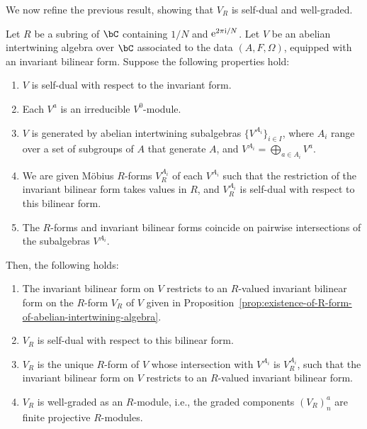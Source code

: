 We now refine the previous result, showing that $V_R$ is self-dual and well-graded.

\begin{prop} \label{prop:extension-of-self-dual-form}Let $R$ be a subring of $\bC$ containing $1/N$ and ${\rm e}^{2\pi {\rm i}/N}$. Let $V$ be an abelian intertwining algebra over $\bC$ associated to the data $(A,F,\Omega)$, equipped with an invariant bilinear form. Suppose the following properties hold:
\begin{enumerate}\itemsep=0pt
\item[$1.$] $V$ is self-dual with respect to the invariant form.
\item[$2.$] Each $V^a$ is an irreducible $V^0$-module.
\item[$3.$] $V$ is generated by abelian intertwining subalgebras $\big\{V^{A_i}\big\}_{i \in I}$, where $A_i$ range over a set of subgroups of $A$ that generate $A$, and $V^{A_i} = \bigoplus_{a \in A_i} V^a$.
\item[$4.$] We are given M\"obius $R$-forms $V^{A_i}_R$ of each $V^{A_i}$ such that the restriction of the invariant bilinear form takes values in $R$, and $V^{A_i}_R$ is self-dual with respect to this bilinear form.
\item[$5.$] The $R$-forms and invariant bilinear forms coincide on pairwise intersections of the subalgebras $V^{A_i}$.
\end{enumerate}
Then, the following holds:
\begin{enumerate}\itemsep=0pt
\item[$1.$] The invariant bilinear form on $V$ restricts to an $R$-valued invariant bilinear form on the $R$-form $V_R$ of $V$ given in Proposition~{\rm \ref{prop:existence-of-R-form-of-abelian-intertwining-algebra}}.
\item[$2.$] $V_R$ is self-dual with respect to this bilinear form.
\item[$3.$] $V_R$ is the unique $R$-form of $V$ whose intersection with $V^{A_i}$ is $V^{A_i}_R$, such that the invariant bilinear form on $V$ restricts to an $R$-valued invariant bilinear form.
\item[$4.$] $V_R$ is well-graded as an $R$-module, i.e., the graded components $(V_R)^a_n$ are finite projective $R$-modules.
\end{enumerate}
\end{prop}
